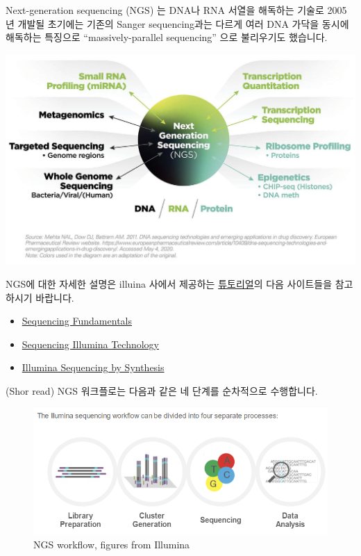 \documentclass[
]{book}
\providecommand{\tightlist}{%
  \setlength{\itemsep}{0pt}\setlength{\parskip}{0pt}}
\begin{document}
Next-generation sequencing (NGS) 는 DNA나 RNA 서열을 해독하는 기술로 2005년 개발될 초기에는 기존의 Sanger sequencing과는 다르게 여러 DNA 가닥을 동시에 해독하는 특징으로 ``massively-parallel sequencing'' 으로 불리우기도 했습니다.

\includegraphics[width=6.25in,height=\textheight]{images/12/ngs.png}

NGS에 대한 자세한 설명은 illuina 사에서 제공하는 \href{https://sapac.illumina.com/science/technology/next-generation-sequencing/beginners/tutorials.html}{튜토리얼}의 다음 사이트들을 참고하시기 바랍니다.

\begin{itemize}
\tightlist
\item
  \href{https://support.illumina.com/content/dam/illumina-support/courses/sequencing-fundamentals/story_html5.html?iframe}{Sequencing Fundamentals}
\item
  \href{https://support.illumina.com/content/dam/illumina-support/courses/Sequencing_Illumina_Technology/story_html5.html?iframe}{Sequencing Illumina Technology}
\item
  \href{https://www.youtube.com/watch?v=fCd6B5HRaZ8\&ab_channel=Illumina}{Illumina Sequencing by Synthesis}
\end{itemize}

(Shor read) NGS 워크플로는 다음과 같은 네 단계를 순차적으로 수행합니다.

\begin{figure}
\centering
\includegraphics[width=5.20833in,height=\textheight]{images/12/ngs_workflow.png}
\caption{NGS workflow, figures from Illumina}
\end{figure}
\end{document}
